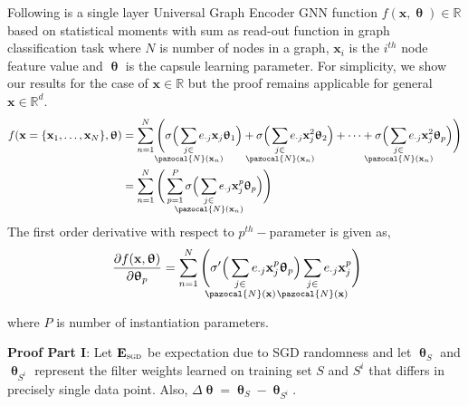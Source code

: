 \documentclass{article}
\newcommand{\Na}{\pazocal{N}}
\begin{document}
Following is a single layer Universal Graph Encoder  GNN function $f(\mathbf{x},\bm{\uptheta} ) \in \mathbb{R}$   based on statistical moments with sum as read-out function in graph classification task where $N$ is number of nodes in a graph, $\mathbf{x}_i$ is the $i^{th}$ node feature value and $\bm{\uptheta}$ is the capsule learning parameter. For simplicity, we show our results for the case of  $\mathbf{x} \in \mathbb{R}$ but the proof remains applicable for general  $\mathbf{x} \in \mathbb{R}^{d}$.
\begin{equation}\label{eq:gcnn_node}
\begin{split}
f(\mathbf{x}=\{\mathbf{x}_1, \dots, \mathbf{x}_N \},\bm{\uptheta} ) &= \sum_{n=1}^{N} \Bigg(\sigma\Big( \sum_{\mathclap{\substack{j\in \\ \Na(\mathbf{x}_n)}}}  e_{\cdot j}  \mathbf{x}_{j}  \bm{\uptheta}_{1} \Big) + \sigma\Big( \sum_{\mathclap{\substack{j\in \\ \Na(\mathbf{x}_n)}}}  e_{\cdot j}  \mathbf{x}^{2}_{j}  \bm{\uptheta}_{2} \Big) + \cdots + \sigma\Big( \sum_{\mathclap{\substack{j\in \\ \Na(\mathbf{x}_n)}}}  e_{\cdot j}  \mathbf{x}^{2}_{j}  \bm{\uptheta}_{p} \Big) \Bigg)  \\
&=  \sum_{n=1}^{N} \Bigg( \sum_{p=1}^{P}\sigma \Big( \sum_{\mathclap{\substack{j\in \\ \Na(\mathbf{x}_n)}}}  e_{\cdot j}  \mathbf{x}^{p}_{j}  \bm{\uptheta}_{p} \Big) \Bigg)   \\
\end{split}
\end{equation}
The first order derivative with respect to $p^{th}-$parameter is given as,
\begin{equation}~\label{eq:gcnn_derivative}	
\frac{\partial f(\mathbf{x},\bm{\uptheta} )}{\partial \bm{\uptheta}_{p} }  = \sum_{n=1}^{N} \Bigg( \sigma' \Big( \sum_{\mathclap{\substack{j\in \\ \Na(\mathbf{x})}}}  e_{\cdot j}  \mathbf{x}^{p}_{j}  \bm{\uptheta}_{p} \Big)  \sum_{\mathclap{\substack{j\in \\ \Na(\mathbf{x}) }}}  e_{\cdot j}  \mathbf{x}^{p}_{j} \Bigg)   
\end{equation}

where $P$ is number of instantiation parameters.



\noindent \textbf{Proof Part I}:   Let $\mathbf{E}_{\textsc{sgd}}$ be expectation due to SGD randomness and let $\bm{\uptheta}_S$ and  $\bm{\uptheta}_{S^i}$ represent the     filter weights learned on training set $S$ and $S^i$ that differs in precisely single data point. Also,   $\Delta \bm{\uptheta} = \bm{\uptheta}_S  - \bm{\uptheta}_{S^i}  $. 
\end{document}
